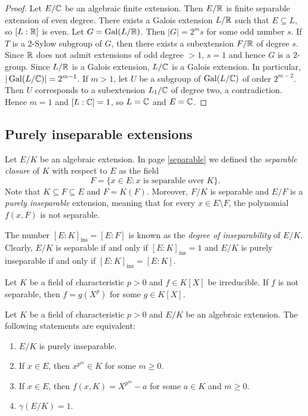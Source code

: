 \begin{proof}
    Let $E/\mathbb{C}$ be an algebraic finite extension. Then $E/\mathbb{R}$ 
    is finite separable extension of even degree. There exists a Galois
    extension 
    $L/\mathbb{R}$ such that $E\subseteq L$, so $[L:\mathbb{R}]$ is even. Let $G=\operatorname{Gal}(L/\mathbb{R})$. 
    Then $|G|=2^ms$ for some odd number $s$. If $T$ is a 2-Sylow subgroup
    of $G$, 
    then there exists a subextension $F/\mathbb{R}$ of degree $s$. Since 
    $\mathbb{R}$ does not admit extensions of odd degree $>1$, $s=1$ and
    hence $G$ is a $2$-group. Since 
    $L/\mathbb{R}$ is a Galois extension, $L/\mathbb{C}$ is a Galois extension. 
    In particular, $|\operatorname{Gal}(L/\mathbb{C})|=2^{m-1}$. If $m>1$, 
    let $U$ be a subgroup of $\operatorname{Gal}(L/\mathbb{C})$ of order $2^{m-2}$. Then $U$ corresponds 
    to a subextension $L_1/\mathbb{C}$ of degree two, a contradiction. Hence $m=1$ 
    and $[L:\mathbb{C}]=1$, so $L=\mathbb{C}$ and $E=\mathbb{C}$. 
\end{proof}

\subsection{Purely inseparable extensions}

Let $E/K$ be an algebraic extension. 
In page \ref{separable} we defined the 
\emph{separable closure} of $K$ with respect to $E$ as 
the field 
\[
    F=\{x\in E:x\text{ is separable over }K\}.
\]
Note that $K\subseteq F\subseteq E$ 
and $F=K(F)$. Moreover, 
$F/K$ is separable and 
$E/F$ is a \emph{purely inseparable} extension, meaning that
for every $x\in E\setminus F$, the polynomial $f(x,F)$ is not separable. 

The number $[E:K]_{\operatorname{ins}}=[E:F]$ is known as the \emph{degree of inseparability} of $E/K$. 
Clearly, $E/K$ is separable if and only if $[E:K]_{\operatorname{ins}}=1$ and 
$E/K$ is purely inseparable if and only if $[E:K]_{\operatorname{ins}}=[E:K]$. 

\begin{exercise}
    \label{xca:separable_charp}
    Let $K$ be a field of characteristic $p>0$ and $f\in K[X]$ be irreducible.
    If $f$ is not separable, then $f=g(X^p)$ for some $g\in K[X]$. 
\end{exercise}



\begin{proposition}
Let $K$ be a field of characteristic $p>0$ and
$E/K$ be an algebraic extension. The following statements are equivalent:
\begin{enumerate}
    \item $E/K$ is purely inseparable.
    \item If $x\in E$, then $x^{p^m}\in K$ for some $m\geq0$.
    \item If $x\in E$, then $f(x,K)=X^{p^m}-a$ for some $a\in K$ and $m\geq0$. 
    \item $\gamma(E/K)=1$. 
\end{enumerate}
\end{proposition}


